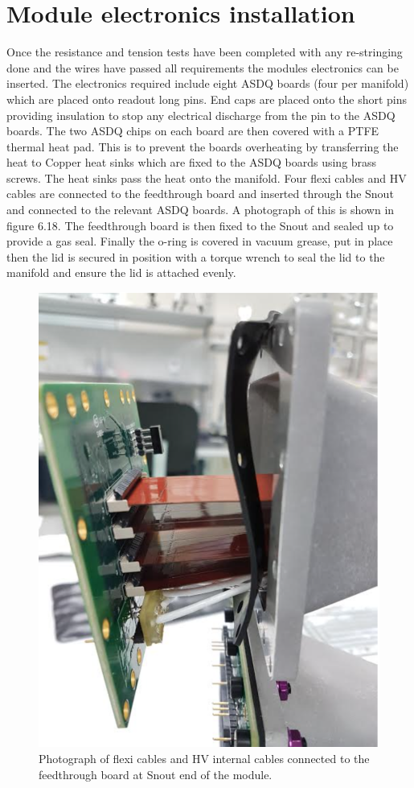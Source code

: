 \section{Module electronics installation}

Once the resistance and tension tests have been completed with any re-stringing done and the wires have passed all requirements the modules electronics can be inserted. The electronics required include eight ASDQ boards (four per manifold) which are placed onto readout long pins. End caps are placed onto the short pins providing insulation to stop any electrical discharge from the pin to the ASDQ boards. The two ASDQ chips on each board are then covered with a PTFE thermal heat pad. This is to prevent the boards overheating by transferring the heat to Copper heat sinks which are fixed to the ASDQ boards using brass screws. The heat sinks pass the heat onto the manifold. Four flexi cables and HV cables are connected to the feedthrough board and inserted through the Snout and connected to the relevant ASDQ boards. A photograph of this is shown in figure 6.18. The feedthrough board is then fixed to the Snout and sealed up to provide a gas seal. Finally the o-ring is covered in vacuum grease, put in place then the lid is secured in position with a torque wrench to seal the lid to the manifold and ensure the lid is attached evenly.

\begin{figure}[!h]
\centering
\includegraphics[scale=0.4]{Figures/flexicables}
\decoRule
\caption{Photograph of flexi cables and HV internal cables connected to the feedthrough board at Snout end of the module.}
\label{fig:flexicables}
\end{figure}

